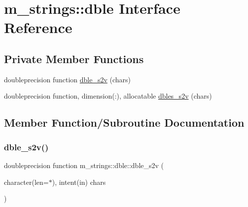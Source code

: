 \hypertarget{interfacem__strings_1_1dble}{}\section{m\+\_\+strings\+:\+:dble Interface Reference}
\label{interfacem__strings_1_1dble}
\subsection*{Private Member Functions}
\begin{DoxyCompactItemize}
\item 
doubleprecision function \mbox{\hyperlink{interfacem__strings_1_1dble_aadfd361a017d8523b04431a6947c194d}{dble\+\_\+s2v}} (chars)
\item 
doubleprecision function, dimension(\+:), allocatable \mbox{\hyperlink{interfacem__strings_1_1dble_afaec5e6f72e484baa351d2183c5fe220}{dbles\+\_\+s2v}} (chars)
\end{DoxyCompactItemize}


\subsection{Member Function/\+Subroutine Documentation}
\mbox{\label{interfacem__strings_1_1dble_aadfd361a017d8523b04431a6947c194d}} 
\subsubsection{\texorpdfstring{dble\+\_\+s2v()}{dble\_s2v()}}
{\footnotesize\ttfamily doubleprecision function m\+\_\+strings\+::dble\+::dble\+\_\+s2v (\begin{DoxyParamCaption}\item[{character(len=$\ast$), intent(in)}]{chars }\end{DoxyParamCaption})\hspace{0.3cm}{\ttfamily [private]}}

\mbox{\label{interfacem__strings_1_1dble_afaec5e6f72e484baa351d2183c5fe220}} 
